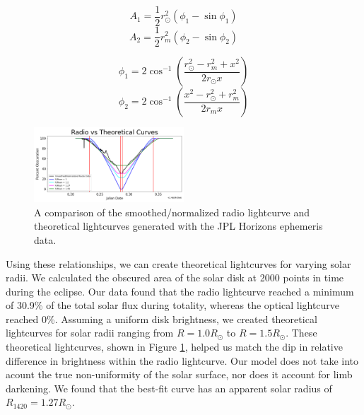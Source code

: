 \begin{equation}
  A_1 = \frac{1}{2}r_{\odot}^2\left(\phi_1 - \sin\phi_1\right)
\end{equation}
\begin{equation}
  A_2 = \frac{1}{2}r_{m}^2\left(\phi_2 - \sin\phi_2\right)
\end{equation}

\begin{equation}
  \phi_1 = 2\cos^{-1}\left(\frac{r_{\odot}^2 - r_{m}^2+x^2}{2r_{\odot}x}\right)
\end{equation}
\begin{equation}
  \phi_2 = 2\cos^{-1}\left(\frac{x^2 - r_{\odot}^2 + r_{m}^2}{2r_{m}x}\right)
\end{equation}


\begin{figure}
  \includegraphics[width=0.5\textwidth]{figures/RadiovsTheoretical.png}
  \caption{\label{fig:RadiovsTheoretical} A comparison of the smoothed/normalized radio lightcurve and theoretical lightcurves generated with the JPL Horizons ephemeris data.}
\end{figure}

Using these relationships, we can create theoretical lightcurves for varying solar radii.
We calculated the obscured area of the solar disk at 2000 points in time during the eclipse.
Our data found that the radio lightcurve reached a minimum of 30.9\% of the total solar flux during totality, whereas the optical lightcurve reached 0\%.
Assuming a uniform disk brightness, we created theoretical lightcurves for solar radii ranging from $R = 1.0 R_{\odot}$ to $R = 1.5 R_{\odot}$.
These theoretical lightcurves, shown in Figure \ref{fig:RadiovsTheoretical}, helped us match the dip in relative difference in brightness within the radio lightcurve.
Our model does not take into acount the true non-uniformity of the solar surface, nor does it account for limb darkening.
We found that the best-fit curve has an apparent solar radius of $R_{\mathrm{1420}} = 1.27 R_{\odot}$.
